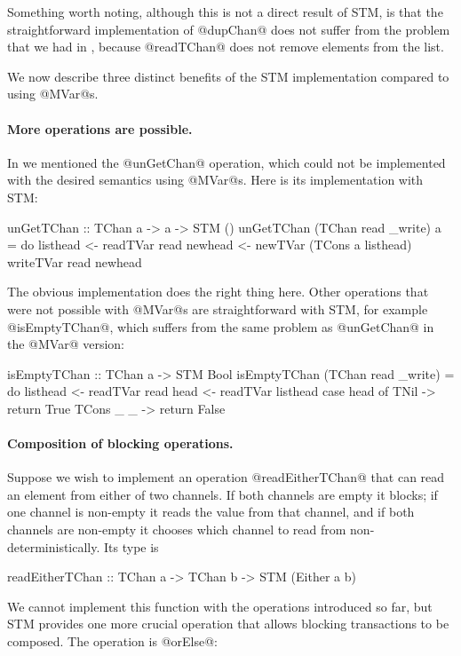 Something worth noting, although this is not a direct result of STM,
is that the straightforward implementation of @dupChan@ does not
suffer from the problem that we had in , because
@readTChan@ does not remove elements from the list.

We now describe three distinct benefits of the STM implementation
compared to using @MVar@s.

\paragraph{More operations are possible.} In  we
mentioned the @unGetChan@ operation, which could not be implemented
with the desired semantics using @MVar@s.  Here is its implementation
with STM:

\begin{haskell}
unGetTChan :: TChan a -> a -> STM ()
unGetTChan (TChan read _write) a = do
   listhead <- readTVar read
   newhead <- newTVar (TCons a listhead)
   writeTVar read newhead
\end{haskell}

\noindent The obvious implementation does the right thing here.  Other
operations that were not possible with @MVar@s are straightforward
with STM, for example @isEmptyTChan@, which suffers from the same
problem as @unGetChan@ in the @MVar@ version:

\begin{haskell}
isEmptyTChan :: TChan a -> STM Bool
isEmptyTChan (TChan read _write) = do
  listhead <- readTVar read
  head <- readTVar listhead
  case head of
    TNil -> return True
    TCons _ _ -> return False
\end{haskell}

\paragraph{Composition of blocking operations.}  Suppose we wish to
implement an operation @readEitherTChan@ that can read an element from
either of two channels.  If both channels are empty it blocks; if one
channel is non-empty it reads the value from that channel, and if both
channels are non-empty it chooses which channel to read from
non-deterministically.  Its type is

\begin{haskell}
readEitherTChan :: TChan a -> TChan b -> STM (Either a b)
\end{haskell}

\noindent We cannot implement this function with the operations
introduced so far, but STM provides one more crucial operation that
allows blocking transactions to be composed.  The operation is
@orElse@:

